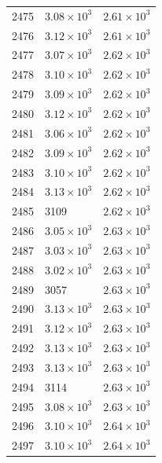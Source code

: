 \begin{table}[H]
\begin{tabular}{lll}
2475 & $\displaystyle 3.08 \times 10^{3}$ & $\displaystyle 2.61 \times 10^{3}$ \\
2476 & $\displaystyle 3.12 \times 10^{3}$ & $\displaystyle 2.61 \times 10^{3}$ \\
2477 & $\displaystyle 3.07 \times 10^{3}$ & $\displaystyle 2.62 \times 10^{3}$ \\
2478 & $\displaystyle 3.10 \times 10^{3}$ & $\displaystyle 2.62 \times 10^{3}$ \\
2479 & $\displaystyle 3.09 \times 10^{3}$ & $\displaystyle 2.62 \times 10^{3}$ \\
2480 & $\displaystyle 3.12 \times 10^{3}$ & $\displaystyle 2.62 \times 10^{3}$ \\
2481 & $\displaystyle 3.06 \times 10^{3}$ & $\displaystyle 2.62 \times 10^{3}$ \\
2482 & $\displaystyle 3.09 \times 10^{3}$ & $\displaystyle 2.62 \times 10^{3}$ \\
2483 & $\displaystyle 3.10 \times 10^{3}$ & $\displaystyle 2.62 \times 10^{3}$ \\
2484 & $\displaystyle 3.13 \times 10^{3}$ & $\displaystyle 2.62 \times 10^{3}$ \\
2485 & 3109 & $\displaystyle 2.62 \times 10^{3}$ \\
2486 & $\displaystyle 3.05 \times 10^{3}$ & $\displaystyle 2.63 \times 10^{3}$ \\
2487 & $\displaystyle 3.03 \times 10^{3}$ & $\displaystyle 2.63 \times 10^{3}$ \\
2488 & $\displaystyle 3.02 \times 10^{3}$ & $\displaystyle 2.63 \times 10^{3}$ \\
2489 & 3057 & $\displaystyle 2.63 \times 10^{3}$ \\
2490 & $\displaystyle 3.13 \times 10^{3}$ & $\displaystyle 2.63 \times 10^{3}$ \\
2491 & $\displaystyle 3.12 \times 10^{3}$ & $\displaystyle 2.63 \times 10^{3}$ \\
2492 & $\displaystyle 3.13 \times 10^{3}$ & $\displaystyle 2.63 \times 10^{3}$ \\
2493 & $\displaystyle 3.13 \times 10^{3}$ & $\displaystyle 2.63 \times 10^{3}$ \\
2494 & 3114 & $\displaystyle 2.63 \times 10^{3}$ \\
2495 & $\displaystyle 3.08 \times 10^{3}$ & $\displaystyle 2.63 \times 10^{3}$ \\
2496 & $\displaystyle 3.10 \times 10^{3}$ & $\displaystyle 2.64 \times 10^{3}$ \\
2497 & $\displaystyle 3.10 \times 10^{3}$ & $\displaystyle 2.64 \times 10^{3}$ \\

\end{tabular}
\end{table}
